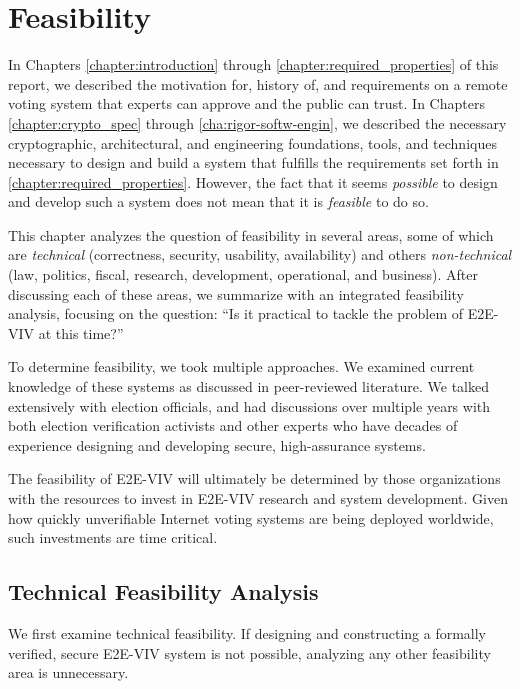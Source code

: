 \chapter{Feasibility}
\label{chapter:feasibility}

In Chapters \ref{chapter:introduction} through
\ref{chapter:required_properties} of this report, we described the
motivation for, history of, and requirements on a remote voting system
that experts can approve and the public can trust. In Chapters
\ref{chapter:crypto_spec} through \ref{cha:rigor-softw-engin}, we
described the necessary cryptographic, architectural, and engineering
foundations, tools, and techniques necessary to design and build a
system that fulfills the requirements set forth in
\autoref{chapter:required_properties}. However, the fact that it seems
\emph{possible} to design and develop such a system does not mean that
it is \emph{feasible} to do so.

This chapter analyzes the question of feasibility in several areas,
some of which are \emph{technical} (correctness, security, usability,
availability) and others \emph{non-technical} (law, politics, fiscal,
research, development, operational, and business). After discussing
each of these areas, we summarize with an integrated feasibility
analysis, focusing on the question: ``Is it practical to tackle the
problem of E2E-VIV at this time?''

To determine feasibility, we took multiple approaches. We examined
current knowledge of these systems as discussed in peer-reviewed
literature. We talked extensively with election officials, and had
discussions over multiple years with both election verification
activists and other experts who have decades of experience designing
and developing secure, high-assurance systems.

The feasibility of E2E-VIV will ultimately be determined by those
organizations with the resources to invest in E2E-VIV research and
system development. Given how quickly unverifiable Internet voting
systems are being deployed worldwide, such investments are time
critical.

\section{Technical Feasibility Analysis}

We first examine technical feasibility. If designing and constructing
a formally verified, secure E2E-VIV system is not possible, analyzing
any other feasibility area is unnecessary.


